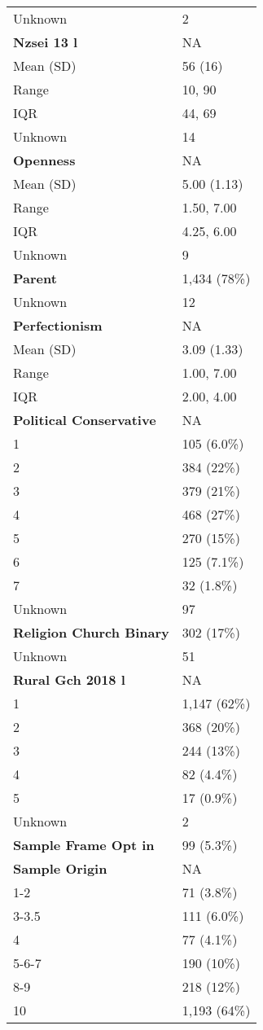 \documentclass[
  singlecolumn]{article}
\begin{document}
\begin{longtable}[]{@{}ll@{}}
Unknown & 2 \\
\textbf{Nzsei 13 l} & NA \\
Mean (SD) & 56 (16) \\
Range & 10, 90 \\
IQR & 44, 69 \\
Unknown & 14 \\
\textbf{Openness} & NA \\
Mean (SD) & 5.00 (1.13) \\
Range & 1.50, 7.00 \\
IQR & 4.25, 6.00 \\
Unknown & 9 \\
\textbf{Parent} & 1,434 (78\%) \\
Unknown & 12 \\
\textbf{Perfectionism} & NA \\
Mean (SD) & 3.09 (1.33) \\
Range & 1.00, 7.00 \\
IQR & 2.00, 4.00 \\
\textbf{Political Conservative} & NA \\
1 & 105 (6.0\%) \\
2 & 384 (22\%) \\
3 & 379 (21\%) \\
4 & 468 (27\%) \\
5 & 270 (15\%) \\
6 & 125 (7.1\%) \\
7 & 32 (1.8\%) \\
Unknown & 97 \\
\textbf{Religion Church Binary} & 302 (17\%) \\
Unknown & 51 \\
\textbf{Rural Gch 2018 l} & NA \\
1 & 1,147 (62\%) \\
2 & 368 (20\%) \\
3 & 244 (13\%) \\
4 & 82 (4.4\%) \\
5 & 17 (0.9\%) \\
Unknown & 2 \\
\textbf{Sample Frame Opt in} & 99 (5.3\%) \\
\textbf{Sample Origin} & NA \\
1-2 & 71 (3.8\%) \\
3-3.5 & 111 (6.0\%) \\
4 & 77 (4.1\%) \\
5-6-7 & 190 (10\%) \\
8-9 & 218 (12\%) \\
10 & 1,193 (64\%) \\
\end{longtable}
\end{document}
